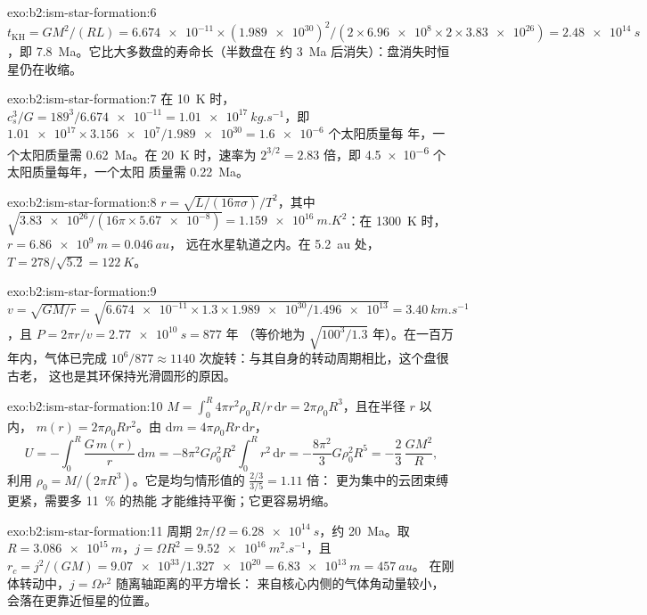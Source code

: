 \begin{solution}{exo:b2:ism-star-formation:6}
$t_{\mathrm{KH}} = GM^2/(RL) = \num{6.674e-11}\times(\num{1.989e30})^2/(2\times
\num{6.96e8}\times2\times\num{3.83e26}) = \qty{2.48e14}{s}$，即
\qty{7.8}{Ma}。它比大多数盘的寿命长（半数盘在
约 \qty{3}{Ma} 后消失）：盘消失时恒星仍在收缩。
\end{solution}

\begin{solution}{exo:b2:ism-star-formation:7}
在 \qty{10}{K} 时，$c_s^3/G = 189^3/\num{6.674e-11} = \qty{1.01e17}{kg.s^{-1}}$，即
$\num{1.01e17}\times\num{3.156e7}/\num{1.989e30} = \num{1.6e-6}$ 个太阳质量每
年，一个太阳质量需 \qty{0.62}{Ma}。在 \qty{20}{K} 时，速率为
$2^{3/2} = 2.83$ 倍，即 \num{4.5e-6} 个太阳质量每年，一个太阳
质量需 \qty{0.22}{Ma}。
\end{solution}

\begin{solution}{exo:b2:ism-star-formation:8}
$r = \sqrt{L/(16\pi\sigma)}/T^2$，其中 $\sqrt{\num{3.83e26}/(16\pi\times\num{5.67e-8})}
= \qty{1.159e16}{m.K^2}$：在 \qty{1300}{K} 时，$r = \qty{6.86e9}{m} = \qty{0.046}{au}$，
远在水星轨道之内。在 \qty{5.2}{au} 处，$T = 278/\sqrt{5.2} = \qty{122}{K}$。
\end{solution}

\begin{solution}{exo:b2:ism-star-formation:9}
$v = \sqrt{GM/r} = \sqrt{\num{6.674e-11}\times1.3\times\num{1.989e30}/\num{1.496e13}}
= \qty{3.40}{km.s^{-1}}$，且 $P = 2\pi r/v = \qty{2.77e10}{s} = 877$ 年
（等价地为 $\sqrt{100^3/1.3}$ 年）。在一百万年内，气体已完成
$10^6/877 \approx \num{1140}$ 次旋转：与其自身的转动周期相比，这个盘很古老，
这也是其环保持光滑圆形的原因。
\end{solution}

\begin{solution}{exo:b2:ism-star-formation:10}
$M = \int_0^R 4\pi r^2\rho_0R/r\,\mathrm dr = 2\pi\rho_0R^3$，且在半径 $r$ 以内，
$m(r) = 2\pi\rho_0Rr^2$。由 $\mathrm dm = 4\pi\rho_0Rr\,\mathrm dr$，
\[
  U = -\int_0^R \frac{G\,m(r)}{r}\,\mathrm dm
    = -8\pi^2G\rho_0^2R^2\int_0^R r^2\,\mathrm dr = -\frac{8\pi^2}{3}G\rho_0^2R^5
    = -\frac23\,\frac{GM^2}{R},
\]
利用 $\rho_0 = M/(2\pi R^3)$。它是均匀情形值的 $\tfrac{2/3}{3/5} = 1.11$ 倍：
更为集中的云团束缚更紧，需要多 \qty{11}{\percent} 的热能
才能维持平衡；它更容易坍缩。
\end{solution}

\begin{solution}{exo:b2:ism-star-formation:11}
周期 $2\pi/\Omega = \qty{6.28e14}{s}$，约 \qty{20}{Ma}。取
$R = \qty{3.086e15}{m}$，$j = \Omega R^2 = \qty{9.52e16}{m^2.s^{-1}}$，且
$r_c = j^2/(GM) = \num{9.07e33}/\num{1.327e20} = \qty{6.83e13}{m} = \qty{457}{au}$。
在刚体转动中，$j = \Omega r^2$ 随离轴距离的平方增长：
来自核心内侧的气体角动量较小，会落在更靠近恒星的位置。
\end{solution}

